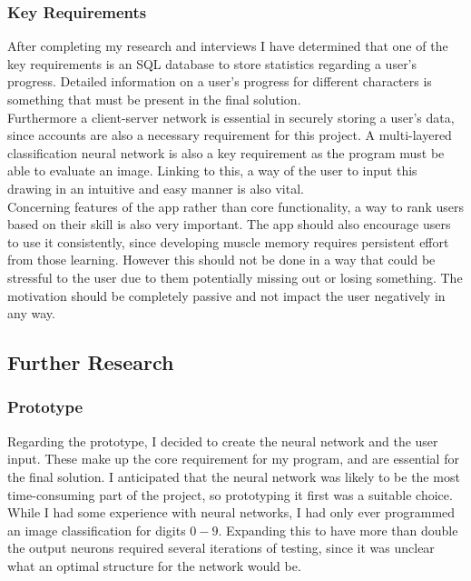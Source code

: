 \documentclass{article}
\begin{document}
\subsubsection{Key Requirements}

After completing my research and interviews I have determined that one of the key
requirements is an SQL database to store statistics regarding a user's progress. Detailed information on a user's progress for different characters is something that must be present in the final solution. \\

Furthermore a client-server network is essential in securely storing a user's data, since accounts are also a necessary requirement for this project. A multi-layered classification neural network is also a key requirement as the program must be able to evaluate an image. Linking to this, a way of the user to input this drawing in an intuitive and easy manner is also vital. \\

Concerning features of the app rather than core functionality, a way to rank users based on their skill is also very important. The app should also encourage users to use it consistently, since developing muscle memory requires persistent effort from those learning. However this should not be done in a way that could be stressful to the user due to them potentially missing out or losing something. The motivation should be completely passive and not impact the user negatively in any way. \\

\newpage
\subsection{Further Research}

\subsubsection{Prototype}

Regarding the prototype, I decided to create the neural network and the user input. These make up the core requirement for my program, and are essential for the final solution. I anticipated that the neural network was likely to be the most time-consuming part of the project, so prototyping it first was a suitable choice. While I had some experience with neural networks, I had only ever programmed an image classification for digits \(0-9\). Expanding this to have more than double the output neurons required several iterations of testing, since it was unclear what an optimal structure for the network would be. \\
\end{document}
